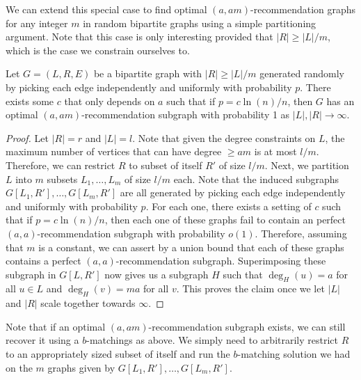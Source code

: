 We can extend this special case to find optimal $(a,am)$-recommendation graphs for any integer $m$ in random bipartite graphs using a simple partitioning argument. Note that this case is only interesting provided that $|R|\geq |L|/m$, which is the case we constrain ourselves to.

\begin{thm}
Let $G=(L,R,E)$ be a bipartite graph with $|R|\geq |L|/m$ generated randomly by picking each edge independently and uniformly with probability $p$. There exists some $c$ that only depends on $a$ such that if $p=c\ln(n)/n$, then $G$ has an optimal $(a,am)$-recommendation subgraph with probability 1 as $|L|,|R|\to\infty$.
\end{thm}
\begin{proof}
Let $|R|=r$ and $|L|=l$. Note that given the degree constraints on $L$, the maximum number of vertices that can have degree $\geq am$ is at most $l/m$. Therefore, we can restrict $R$ to subset of itself $R'$ of size $l/m$. Next, we partition $L$ into $m$ subsets $L_1,\ldots, L_m$ of size $l/m$ each. Note that the induced subgraphs $G[L_1,R'], \ldots, G[L_m,R']$ are all generated by picking each edge independently and uniformly with probability $p$. For each one, there exists a setting of $c$ such that if $p=c\ln(n)/n$, then each one of these graphs fail to contain an perfect $(a,a)$-recommendation subgraph with probability $o(1)$. Therefore, assuming that $m$ is a constant, we can assert by a union bound that each of these graphs contains a perfect $(a,a)$-recommendation subgraph. Superimposing these subgraph in $G[L,R']$ now gives us a subgraph $H$ such that $\deg_H(u) = a$ for all $u\in L$ and $\deg_H(v)=ma$ for all $v$. This proves the claim once we let $|L|$ and $|R|$ scale together towards $\infty$.
\end{proof}

Note that if an optimal $(a,am)$-recommendation subgraph exists, we can still recover it using a $b$-matchings as above. We simply need to arbitrarily restrict $R$ to an appropriately sized subset of itself and run the $b$-matching solution we had on the $m$ graphs given by $G[L_1,R'], \ldots, G[L_m,R']$.
